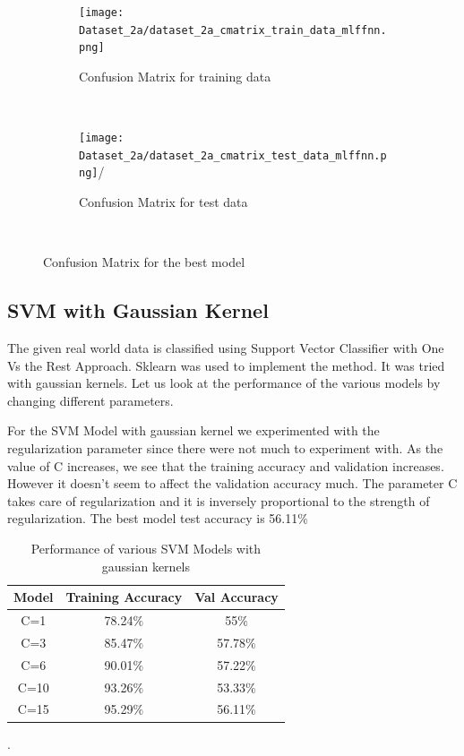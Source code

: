 
\begin{figure}[!ht]
    \centering
    \begin{subfigure}[t]{0.5\textwidth}
        \centering
        \texttt{[image: Dataset\_2a/dataset\_2a\_cmatrix\_train\_data\_mlffnn.png]}
        \caption{Confusion Matrix for training data}
    \end{subfigure}%
    ~ 
    \begin{subfigure}[t]{0.5\textwidth}
        \centering
        \texttt{[image: Dataset\_2a/dataset\_2a\_cmatrix\_test\_data\_mlffnn.png]}/
        \caption{Confusion Matrix for test data}
    \end{subfigure}%
    ~
    \caption{Confusion Matrix for the best model}
    \label{fig:13}
\end{figure}

\newpage
\subsection{SVM with Gaussian Kernel}
The given real world data is classified using Support Vector Classifier with One Vs the Rest Approach. Sklearn was used to implement the method. It was tried with gaussian kernels. Let us look at the performance of the various models by changing different parameters. 


For the SVM Model with gaussian kernel we experimented with the regularization parameter since there were not much to experiment with. As the value of C increases, we see that the training accuracy and validation increases. However it doesn't seem to affect the validation accuracy much. The parameter C takes care of regularization and it is inversely proportional to the strength of regularization. The best model test accuracy is 56.11$\%$

{
\begin{table}[!h]
\centering
\begin{tabular}{ |c|c|c|  }
\hline
\rowcolor{lightgray} Model & Training Accuracy & Val Accuracy\\
\hline
C=1 & 78.24$\%$  & 55$\%$  \\ 
\hline
C=3 & 85.47$\%$  & 57.78$\%$  \\ 
\hline
C=6 & 90.01$\%$  & 57.22$\%$  \\ 
\hline
C=10 & 93.26$\%$  & 53.33$\%$  \\ 
\hline
C=15 & 95.29$\%$  & 56.11$\%$  \\ 
\hline
\end{tabular}
\caption{Performance of various SVM Models with gaussian kernels}.
\label{table:3}
\end{table}
}

